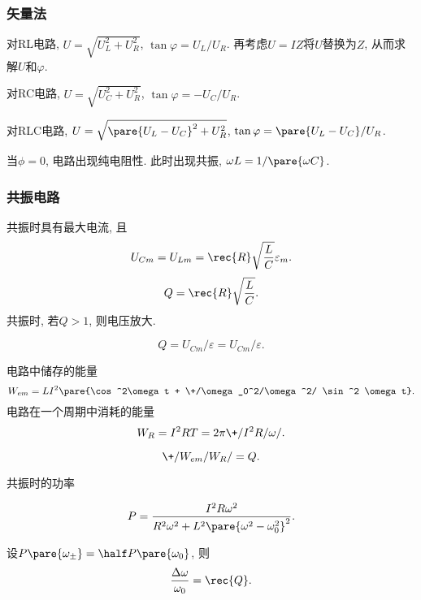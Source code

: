 \documentclass[hidelinks]{ctexart}
\begin{document}

\subsubsection{矢量法} %
\label{ssub:矢量法}

\begin{ex}
    对RL电路, $U = \sqrt{U_L^2 + U_R^2}$, $\tan \varphi = U_L/U_R$. 再考虑$U=IZ$将$U$替换为$Z$, 从而求解$U$和$\varphi$.
\end{ex}

\begin{ex}
    对RC电路, $U = \sqrt{U_C^2 + U_R^2}$, $\tan \varphi = -U_C/U_R$.
\end{ex}

\begin{ex}
    对RLC电路, $U = \sqrt{\pare{U_L-U_C}^2 + U_R^2}$, $\tan \varphi = \pare{U_L-U_C}/U_R$.
\end{ex}

\begin{remark}
    当$\phi = 0$, 电路出现纯电阻性. 此时出现共振, $\omega L = 1/\pare{\omega C}$.
\end{remark}


\subsubsection{共振电路} %
\label{ssub:共振电路}

共振时具有最大电流, 且 
\[ U_{Cm} = U_{Lm} = \rec{R}\sqrt{\frac{L}{C}}\varepsilon_m. \]
\[ Q = \rec{R}\sqrt{\frac{L}{C}}. \]
共振时, 若$Q>1$, 则电压放大.
\begin{proposition}[$Q$作为放大倍数]
    \[ Q = U_{Cm}/\varepsilon = U_{Cm}/\varepsilon. \]
\end{proposition}
电路中储存的能量
\[ W_{em} = LI^2 \pare{\cos^2\omega t + \+/\omega_0^2/\omega^2/ \sin^2 \omega t}. \]
电路在一个周期中消耗的能量
\[ W_R = I^2 RT = 2\pi \+/I^2R/\omega/. \]
\begin{proposition}[$Q$与能量衰减]
    \[ \+/W_{em}/W_R/ = Q. \]
\end{proposition}
共振时的功率

\[ P = \frac{I^2 R\omega^2}{R^2\omega^2 + L^2\pare{\omega^2 - \omega_0^2}^2}. \]
\begin{proposition}[$Q$与半峰展宽]
    设$P\pare{\omega_\pm} = \half P\pare{\omega_0}$, 则
    \[ \frac{\Delta \omega}{\omega_0} = \rec{Q}. \]
\end{proposition}
\end{document}
